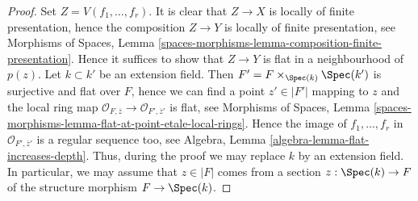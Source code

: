 \begin{proof}
Set $Z = V(f_1, \ldots, f_r)$. It is clear that $Z \to X$ is locally of
finite presentation, hence the composition $Z \to Y$ is locally of finite
presentation, see
Morphisms of Spaces,
Lemma \ref{spaces-morphisms-lemma-composition-finite-presentation}.
Hence it suffices to show that $Z \to Y$ is flat in a neighbourhood of $p(z)$.
Let $k \subset k'$ be an extension field. Then
$F' = F \times_{\Spec(k)} \Spec(k')$ is surjective and
flat over $F$, hence we can find a point $z' \in |F'|$ mapping to $z$
and the local ring map
$\mathcal{O}_{F, \overline{z}} \to \mathcal{O}_{F', \overline{z}'}$ is
flat, see
Morphisms of Spaces,
Lemma \ref{spaces-morphisms-lemma-flat-at-point-etale-local-rings}.
Hence the image of $f_1, \ldots, f_r$ in
$\mathcal{O}_{F', \overline{z}'}$ is a regular sequence too, see
Algebra, Lemma \ref{algebra-lemma-flat-increases-depth}.
Thus, during the proof we may replace $k$ by an extension field.
In particular, we may assume that $z \in |F|$ comes from a section
$z : \Spec(k) \to F$ of the structure morphism $F \to \Spec(k)$.


\end{proof}
